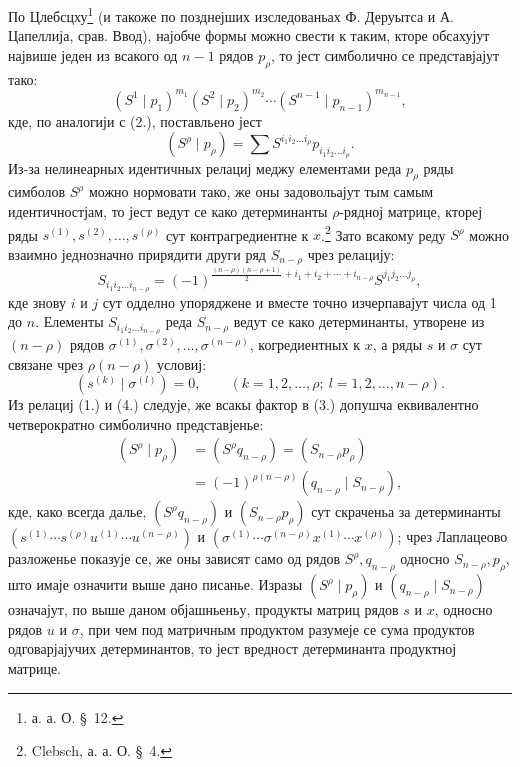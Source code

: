 ﻿\documentclass[11pt]{article}
\begin{document}
По Цлебсцху\footnote{а. а. О. \S\ 12.} (и такоже по позднејших изследованьах Ф. Деруытса и А. Цапеллија, срав. Ввод), најобче формы можно свести к таким, кторе обсахујут највише једен из всакого од $n-1$ рядов $p_\rho$, то јест симболично се представјајут тако:
\begin{equation}
 (S^1\mid p_1)^{m_1}(S^2\mid p_2)^{m_2}\cdots(S^{n-1}\mid p_{n-1})^{m_{n-1}},
\tag{3}
\end{equation}
кде, по аналогији с (2.), поставльено јест
\[
 (S^\rho\mid p_\rho)=\sum S^{i_1i_2\ldots i_\rho}p_{i_1i_2\ldots i_\rho}.
\]
Из-за нелинеарных идентичных релациј меджу елементами реда $p_\rho$ ряды симболов $S^\rho$ можно нормовати тако, же оны задовольајут тым самым идентичностјам, то јест ведут се како детерминанты $\rho$-рядној матрице, ктореј ряды $s^{(1)},s^{(2)},\ldots,s^{(\rho)}$ сут контрагредиентне к $x$.\footnote{Clebsch, а. а. О. \S\ 4.} Зато всакому реду $S^\rho$ можно взаимно једнозначно прирядити други ряд $S_{n-\rho}$ чрез релацију:
\begin{equation}
 S_{i_1i_2\ldots i_{n-\rho}}=(-1)^{\frac{(n-\rho)(n-\rho+1)}2+i_1+i_2+\cdots+i_{n-\rho}}S^{j_1j_2\ldots j_\rho},
\tag{4}
\end{equation}
кде знову $i$ и $j$ сут одделно упоряджене и вместе точно изчерпавајут числа од 1 до $n$. Елементы $S_{i_1i_2\ldots i_{n-\rho}}$ реда $S_{n-\rho}$ ведут се како детерминанты, утворене из $(n-\rho)$ рядов $\sigma^{(1)},\sigma^{(2)},\ldots,\sigma^{(n-\rho)}$, когредиентных к $x$, а ряды $s$ и $\sigma$ сут связане чрез $\rho(n-\rho)$ условиј:
\begin{equation}
 (s^{(k)}\mid \sigma^{(l)})=0,\qquad(k=1,2,\ldots,\rho;\ l=1,2,\ldots,n-\rho).
\tag{5}
\end{equation}
Из релациј (1.) и (4.) следује, же всакы фактор в (3.) допушча еквивалентно четверократно симболично представјенье:
\begin{equation}
\begin{aligned}
 (S^\rho\mid p_\rho)&=(S^\rho q_{n-\rho})=(S_{n-\rho}p_\rho)\\
 &=(-1)^{\rho(n-\rho)}(q_{n-\rho}\mid S_{n-\rho}),
\end{aligned}
\tag{6}
\end{equation}
кде, како всегда далье, $(S^\rho q_{n-\rho})$ и $(S_{n-\rho}p_\rho)$ сут скраченьа за детерминанты $(s^{(1)}\cdots s^{(\rho)}u^{(1)}\cdots u^{(n-\rho)})$ и $(\sigma^{(1)}\cdots\sigma^{(n-\rho)}x^{(1)}\cdots x^{(\rho)})$; чрез Лаплацеово разложенье показује се, же оны зависят само од рядов $S^\rho,q_{n-\rho}$ односно $S_{n-\rho},p_\rho$, што имаје означити выше дано писанье. Изразы $(S^\rho\mid p_\rho)$ и $(q_{n-\rho}\mid S_{n-\rho})$ означајут, по выше даном објашньеньу, продукты матриц рядов $s$ и $x$, односно рядов $u$ и $\sigma$, при чем под матричным продуктом разумеје се сума продуктов одговарјајучих детерминантов, то јест вредност детерминанта продуктној матрице.
\end{document}
